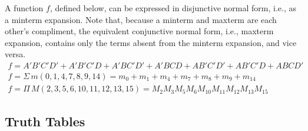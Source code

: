 \documentclass{article}
\begin{document}
    \smallskip\noindent
    A function $f$, defined below, can be expressed in disjunctive normal form, i.e., as a minterm expansion.
    Note that, because a minterm and maxterm are each other's compliment, the equivalent conjunctive normal form, i.e., maxterm expansion, contains only the terms absent from the minterm expansion, and vice versa.
    \begin{gather*}
        f= A'B'C'D' + A'B'C'D + A'BC'D' + A'BCD + AB'C'D' + AB'C'D + ABCD'      \\[.5em]
        f=\Sigma\,m(0,1,4,7,8,9,14) = m_0+m_1+m_4+m_7+m_8+m_9+m_{14}    \\[.5em]
        f=\Pi\,M(2,3,5,6,10,11,12,13,15)=M_2 M_3 M_5 M_6 M_{10}M_{11}M_{12}M_{13}M_{15}
    \end{gather*}

    \pagebreak
    \begin{center}
        \subsection*{Truth Tables}
    \end{center}
    \vspace{4em}
\end{document}
